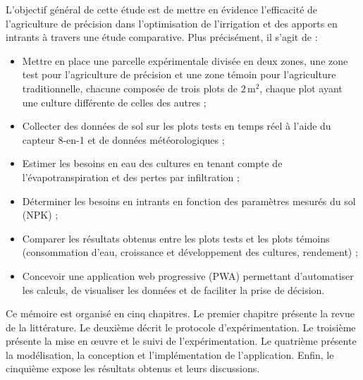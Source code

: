 L’objectif général de cette étude est de mettre en évidence l’efficacité de l’agriculture de précision dans l’optimisation de l’irrigation et des apports en intrants à travers une étude comparative. Plus précisément, il s’agit de :

\begin{itemize}[label=$\bullet$]
   	\item Mettre en place une parcelle expérimentale divisée en deux zones, une zone test pour l’agriculture de précision et une zone témoin pour l’agriculture traditionnelle, chacune composée de trois plots de  $2\,\mathrm{m^2}$, chaque plot ayant une culture différente de celles des autres ;
     \item Collecter des données de sol sur les plots tests en temps réel à l’aide du capteur 8-en-1 et de données météorologiques ;
     \item Estimer les besoins en eau des cultures en tenant compte de l’évapotranspiration et des pertes par infiltration ; 
     \item Déterminer les besoins en intrants en fonction des paramètres mesurés du sol (NPK) ; 
     \item Comparer les résultats obtenus entre les plots tests et les plots témoins (consommation d’eau, croissance et développement des cultures, rendement) ;
     \item Concevoir une application web progressive (PWA) permettant d’automatiser les calculs, de visualiser les données et de faciliter la prise de décision.
\end{itemize}

Ce mémoire est organisé en cinq chapitres. Le premier chapitre présente la revue de la littérature. Le deuxième décrit le protocole d’expérimentation. Le troisième présente la mise en œuvre et le suivi de l’expérimentation. Le quatrième présente la modélisation, la conception et l’implémentation de l’application. Enfin, le cinquième expose les résultats obtenus et leurs discussions.
